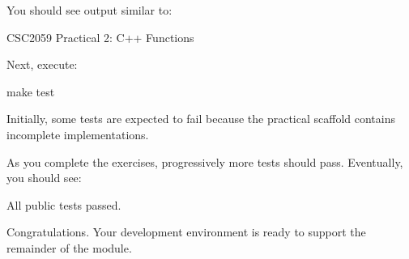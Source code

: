 \documentclass{csc2059practical}
\begin{document}
You should see output similar to:

\begin{terminal}
CSC2059 Practical 2: C++ Functions
\end{terminal}

Next, execute:

\begin{bashcode}
make test
\end{bashcode}

Initially, some tests are expected to fail because the practical scaffold contains incomplete implementations.

As you complete the exercises, progressively more tests should pass. Eventually, you should see:

\begin{terminal}
All public tests passed.
\end{terminal}

Congratulations. Your development environment is ready to support the remainder of the module.
\end{document}
